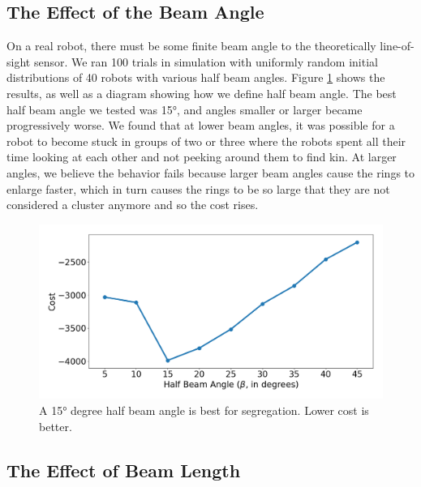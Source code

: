 \documentclass[conference]{IEEEtran}
\begin{document}
  \subsection{The Effect of the Beam Angle} \label{section:beam_angle}

    On a real robot, there must be some finite beam angle to the theoretically line-of-sight sensor. We ran 100 trials in simulation with uniformly random initial distributions of 40 robots with various half beam angles. Figure \ref{fig:beam_angle} shows the results, as well as a diagram showing how we define half beam angle. The best half beam angle we tested was \ang{15}, and angles smaller or larger became progressively worse. We found that at lower beam angles, it was possible for a robot to become stuck in groups of two or three where the robots spent all their time looking at each other and not peeking around them to find kin. At larger angles, we believe the behavior fails because larger beam angles cause the rings to enlarge faster, which in turn causes the rings to be so large that they are not considered a cluster anymore and so the cost rises.

    \begin{figure}[H]
      \centering
      \includegraphics[width=1\linewidth]{./images/beam_angle.png}
      \caption{A \ang{15} degree half beam angle is best for segregation. Lower cost is better.}
      \label{fig:beam_angle}
    \end{figure}

  \subsection{The Effect of Beam Length} \label{section:beam_length}
\end{document}
